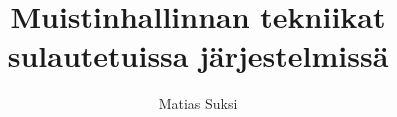\documentclass[language=finnish,version=final,mainfont=none,sharelatex=false]{utuftthesis}
\providecommand{\algorithmname}{Algoritmi}
\begin{document}
\title{Muistinhallinnan tekniikat sulautetuissa järjestelmissä}
\author{Matias Suksi}

\maketitle


\tableofcontents

\renewcommand{\algorithmname}{\listingscaption}


\begin{comment}
To better organize things, create a new tex file for each chapter
and input it below.

Avoid using the å, ä, ö or <space> characters in referred names and
underscores \_ in file names (may break hyperref).

Good luck!
\end{comment}









\printbibliography

\begin{comment}
Important! Create the appendix chapters with command \textbackslash appchapter\{some
name\} instead of \textbackslash chapter\{some name\} for the automagic
page counting to work!
\end{comment}
\end{document}
